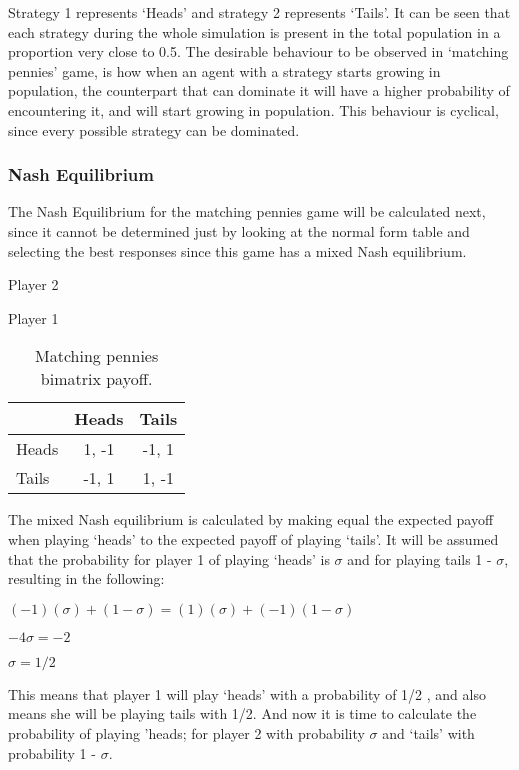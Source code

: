 Strategy 1 represents `Heads' and strategy 2 represents `Tails'. It can be seen that each strategy during the whole simulation is present in the total population in a proportion very close to 0.5. The desirable behaviour to be observed in `matching pennies' game, is how when an agent with a strategy starts growing in population, the counterpart that can dominate it will have a higher probability of encountering it, and will start growing in population. This behaviour is cyclical, since every possible strategy can be dominated.

\subsubsection{Nash Equilibrium}
The Nash Equilibrium for the matching pennies game will be calculated next, since it cannot be determined just by looking at the normal form table and selecting the best responses since this game has a mixed Nash equilibrium.

\begin{table}[H]
\begin{center}
Player 2

Player 1
\begin{tabular}{|l|c|c|}
\hline
 & Heads & Tails\\ 
\hline
Heads & 1, -1 & -1, 1\\
\hline
Tails & -1, 1 & 1, -1\\
\hline
\end{tabular}

\caption{ Matching pennies bimatrix payoff.}
\label{fig:mpnashmx}	
\end{center}
\end{table}

The mixed Nash equilibrium is calculated by making equal the expected payoff  when playing `heads' to the expected payoff of playing `tails'. It will be assumed that the probability for player 1 of playing `heads' is $\sigma$ and for playing tails 1 - $\sigma$, resulting in the following:
\begin{center}
$(-1)(\sigma) + (1 - \sigma) = (1)(\sigma) + (-1)(1 - \sigma)$
\end{center}
\begin{center}
$-4 \sigma = -2$
\end{center}
\begin{center}
$\sigma = 1/2$
\end{center}
This means that player 1 will play `heads' with a probability of 1/2 , and also means she will be playing tails with 1/2. And now it is time to calculate the probability of playing 'heads; for player 2 with probability $\sigma$ and `tails' with probability 1 - $\sigma$.

